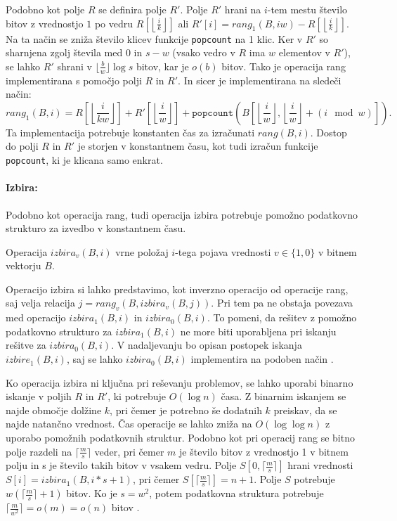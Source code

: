 Podobno kot polje $R$ se definira polje $R'$. Polje $R'$ hrani na $i$-tem mestu število bitov z vrednostjo $1$ po vedru $R[\left\lfloor\frac{i}{k} \right\rfloor]$ ali $R'[i]=rang_1(B,iw)-R[\left\lfloor\frac{i}{k} \right\rfloor]$. Na ta način se zniža število klicev funkcije \texttt{popcount} na 1 klic. Ker v $R'$ so sharnjena zgolj števila med 0 in $s-w$ (vsako vedro v $R$ ima $w$ elementov v $R'$), se lahko $R'$ shrani v $\lfloor\frac{b}{w}\rfloor\log{s}$ bitov, kar je $o(b)$ bitov. Tako je operacija rang implementirana s pomočjo polji $R$ in $R'$. In sicer je implementirana na sledeči način:
\begin{equation}
    rang_1(B,i)=R\left[\left\lfloor\frac{i}{kw} \right\rfloor\right]+ R'\left[\left\lfloor\frac{i}{w} \right\rfloor\right]+\texttt{popcount}\left(B\left[\left\lfloor\frac{i}{w} \right\rfloor,\left\lfloor\frac{i}{w} \right\rfloor+(i \mod w)\right]\right).
\end{equation}
Ta implementacija potrebuje konstanten čas za izračunati $rang(B,i)$. Dostop do polji $R$ in $R'$ je storjen v konstantnem času, kot tudi izračun funkcije \texttt{popcount}, ki je klicana samo enkrat\cite{Navarro2016}.

\paragraph{Izbira:}
Podobno kot operacija rang, tudi operacija izbira potrebuje pomožno podatkovno strukturo za izvedbo v konstantnem času. 
\begin{defi}
    Operacija $izbira_v(B,i)$ vrne položaj $i$-tega pojava vrednosti $v\in\{1,0\}$ v bitnem vektorju $B$.
\end{defi}
Operacijo izbira si lahko predstavimo, kot inverzno operacijo od operacije rang, saj velja relacija $j=rang_v(B,izbira_v(B,j))$. Pri tem pa ne obstaja povezava med operacijo $izbira_1(B,i)$ in $izbira_0(B,i)$. To pomeni, da rešitev z pomožno podatkovno strukturo za $izbira_1(B,i)$ ne more biti uporabljena pri iskanju rešitve za $izbira_0(B,i)$. V nadaljevanju bo opisan postopek iskanja $izbire_1(B,i)$, saj se lahko $izbira_0(B,i)$ implementira na podoben način \cite{Navarro2016}.

Ko operacija izbira ni ključna pri reševanju problemov, se lahko uporabi binarno iskanje v poljih $R$ in $R'$, ki potrebuje $O(\log{n})$ časa. Z binarnim iskanjem se najde območje dolžine $k$, pri čemer je potrebno še dodatnih $k$ preiskav, da se najde natančno vrednost.
Čas operacije se lahko zniža na $O(\log\log n)$ z uporabo pomožnih podatkovnih struktur. Podobno kot pri operacij rang se bitno polje razdeli na $\lceil \frac{m}{s} \rceil$ veder, pri čemer $m$ je število bitov z vrednostjo 1 v bitnem polju in s je število takih bitov v vsakem vedru. Polje $S[0,\lceil \frac{m}{s} \rceil]$ hrani vrednosti $S[i]=izbira_1(B,i*s+1)$, pri čemer $S[\lceil \frac{m}{s} \rceil]=n+1$. Polje $S$ potrebuje $w(\lceil \frac{m}{s} \rceil +1)$ bitov. Ko je $s=w^2$, potem podatkovna struktura potrebuje $\lceil\frac{m}{w^2}\rceil=o(m)=o(n)$ bitov \cite{Navarro2016}.

